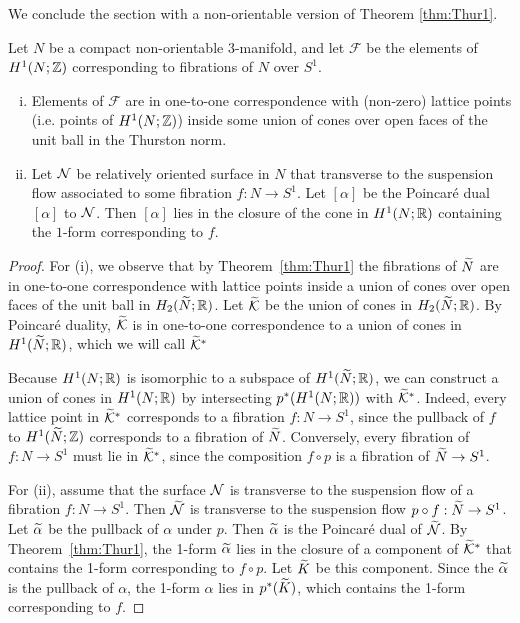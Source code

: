 We conclude the section with a non-orientable version of Theorem \ref{thm:Thur1}.
\begin{thm}
  \label{thm:classifying-fibrations}
  Let $N$ be a compact non-orientable $3$-manifold, and let $\mathcal{F}$ be the elements of $H^1(N; \mathbb{Z})$ corresponding to fibrations of $N$ over $S^1$.
  \begin{enumerate}[(i)]
  \item Elements of $\mathcal{F}$ are in one-to-one correspondence with (non-zero) lattice points (i.e. points of $H^1(N; \mathbb{Z})$) inside some union of cones over open faces of the unit ball in the Thurston norm.
  \item Let $\mathcal{N}$ be relatively oriented surface in $N$ that transverse to the suspension flow associated to some fibration $f: N \to S^1$.  Let $[\alpha]$ be the Poincar\'e dual $[\alpha]$ to $\mathcal{N}$.  Then $[\alpha]$ lies in the closure of the cone in $H^1(N; \mathbb{R})$ containing the $1$-form corresponding to $f$.
  \end{enumerate}
\end{thm}
\begin{proof}
For (i), we observe that by Theorem~\ref{thm:Thur1} the fibrations of $\widetilde{N}$ are in one-to-one correspondence with lattice points inside a union of cones over open faces of the unit ball in $H_2(\widetilde{N};\mathbb{R})$.  Let $\widetilde{\mathcal{K}}$ be the union of cones in $H_2(\widetilde{N};\mathbb{R})$.
 By Poincar\'e duality, $\widetilde{\mathcal{K}}$ is in one-to-one correspondence to a union of cones in $H^1(\widetilde{N};\mathbb{R})$, which we will call $\widetilde{\mathcal{K}}^\ast$

  Because $H^1(N;\mathbb{R})$ is isomorphic to a subspace of $H^1(\widetilde{N};\mathbb{R})$, we can construct a union of cones in $H^1(N; \mathbb{R})$ by intersecting $p^\ast(H^1(N; \mathbb{R}))$ with $\widetilde{\mathcal{K}}^\ast$.
  Indeed, every lattice point in $\widetilde{\mathcal{K}}^\ast$ corresponds to a fibration $f:N\to S^1$, since the pullback of $f$ to $H^1(\widetilde{N}; \mathbb{Z})$ corresponds to a fibration of $\widetilde{N}$.
  Conversely, every fibration of $f:N\rightarrow S^1$ must lie in $\widetilde{\mathcal{K}}^\ast$, since the composition $f\circ p$ is a fibration of $\widetilde{N}\rightarrow S^1$.

  For (ii), assume that the surface $\mathcal{N}$ is transverse to the suspension flow of a fibration $f:N\rightarrow S^1$. Then $\widetilde{\mathcal{N}}$ is transverse to the suspension flow $p \circ f:\widetilde{N}\rightarrow S^1$.  Let $\widetilde{\alpha}$ be the pullback of $\alpha$ under $p$.  Then $\widetilde{\alpha}$ is the Poincar\'e dual of $\widetilde{\mathcal{N}}$.  By Theorem~\ref{thm:Thur1}, the 1-form $\widetilde{\alpha}$ lies in the closure of a component of $\widetilde{\mathcal{K}}^\ast$ that contains the 1-form corresponding to $f\circ p$.  Let $\widetilde{K}$ be this component.
  Since the $\widetilde{\alpha}$ is the pullback of $\alpha$, the 1-form $\alpha$ lies in $p^\ast(\widetilde{K})$, which contains the 1-form corresponding to $f$.
\end{proof}

